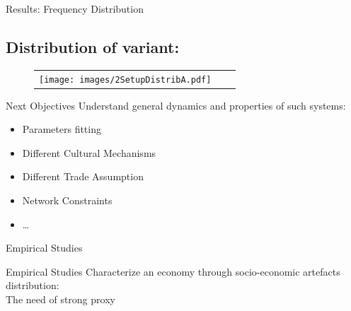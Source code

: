 \documentclass[12pt, notes=show]{beamer}
\begin{document}
\begin{frame}{Results: Frequency Distribution}
    \subsection*{Distribution of variant:}
    \begin{figure}[!h]
	\begin{center}
	    \begin{tabular}{ccc}
		\texttt{[image: images/2SetupDistribA.pdf]}\\
	    \end{tabular}

	\end{center}
    \end{figure}
\end{frame}

\begin{frame}{Next Objectives}
    \vfill
    Understand general dynamics and properties of such systems:
    \vfill
	\begin{itemize}
	\item Parameters fitting
    \vfill
	\item Different Cultural Mechanisms
    \vfill
	\item Different Trade Assumption
    \vfill
	\item Network Constraints
    \vfill
	\item \dots
    \vfill
	\end{itemize}
\end{frame}

\begin{frame}
    \centering
    \Large
   Empirical Studies 
\end{frame}
\begin{frame}{Empirical Studies}
	Characterize an economy through socio-economic artefacts distribution:\\
	\hspace{1cm} The need of strong proxy\\

	\vspace{.5cm}
\end{frame}
\end{document}
